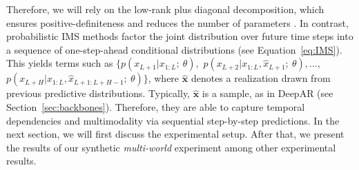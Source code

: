 \documentclass[a4paper,oneside,bibliography=totoc]{scrbook}
\begin{document}
Therefore, we will rely on the low-rank plus diagonal decomposition, which ensures positive-definiteness and reduces the number of parameters \cite{wu_high-dimensional_2020, horn_chapter_2012}.
In contrast, probabilistic IMS methods factor the joint distribution over future time steps into a sequence of one-step-ahead conditional distributions (see Equation~\ref{eq:IMS}). This yields terms such as $\{p(x_{L+1}|x_{1:L};\ \theta),$ $p(x_{L+2}|x_{1:L}, \hat{x}_{L+1};\ \theta), \ldots,$ $p(x_{L+H}|x_{1:L}, \hat{x}_{L+1:L+H-1};\ \theta)\}$, where $\hat{\mathbf{x}}$ denotes a realization drawn from previous predictive distributions. Typically, $\hat{\mathbf{x}}$ is a sample, as in DeepAR \cite{salinas_deepar_2020} (see Section~\ref{sec:backbones}).
Therefore, they are able to capture temporal dependencies and multimodality via sequential step-by-step predictions.
In the next section, we will first discuss the experimental setup. After that, we present the results of our synthetic \textit{multi-world} experiment among other experimental results.
\end{document}
